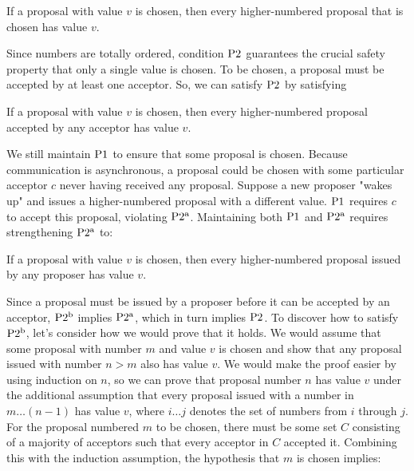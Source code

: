\begin{paxostheoremenv}[$\PaxosTheorem{2}$]
    If a proposal with value $v$ is chosen, then every higher-numbered proposal that is chosen has value $v$.
\end{paxostheoremenv}

Since numbers are totally ordered, condition $\PaxosTheorem{2}$ guarantees the crucial safety property that only a single value is chosen.
To be chosen, a proposal must be accepted by at least one acceptor.
So, we can satisfy $\PaxosTheorem{2}$ by satisfying

\begin{paxostheoremenv}[$\PaxosSubtheorem{2}{a}$]
    If a proposal with value $v$ is chosen, then every higher-numbered proposal accepted by any acceptor has value $v$.
\end{paxostheoremenv}

We still maintain $\operatorname{P1^{}}$ to ensure that some proposal is chosen.
Because communication is asynchronous, a proposal could be chosen with some particular acceptor $c$ never having received any proposal.
Suppose a new proposer "wakes up" and issues a higher-numbered proposal with a different value.
$\operatorname{P1^{}}$ requires $c$ to accept this proposal, violating $\PaxosSubtheorem{2}{a}$.
Maintaining both $\operatorname{P1^{}}$ and $\PaxosSubtheorem{2}{a}$ requires strengthening $\PaxosSubtheorem{2}{a}$ to:

\begin{paxostheoremenv}[$\PaxosSubtheorem{2}{b}$]
    If a proposal with value $v$ is chosen, then every higher-numbered proposal issued by any proposer has value $v$.
\end{paxostheoremenv}

Since a proposal must be issued by a proposer before it can be accepted by an acceptor, $\PaxosSubtheorem{2}{b}$ implies $\PaxosSubtheorem{2}{a}$, which in turn implies $\PaxosTheorem{2}$.
To discover how to satisfy $\PaxosSubtheorem{2}{b}$, let's consider how we would prove that it holds.
We would assume that some proposal with number $m$ and value $v$ is chosen and show that any proposal issued with number $n > m$ also has value $v$.
We would make the proof easier by using induction on $n$, so we can prove that proposal number $n$ has value $v$ under the additional assumption that every proposal issued with a number in $m\ldots(n - 1)$ has value $v$, where $i \ldots j$ denotes the set of numbers from $i$ through $j$.
For the proposal numbered $m$ to be chosen, there must be some set $C$ consisting of a majority of acceptors such that every acceptor in $C$ accepted it.
Combining this with the induction assumption, the hypothesis that $m$ is chosen implies:

